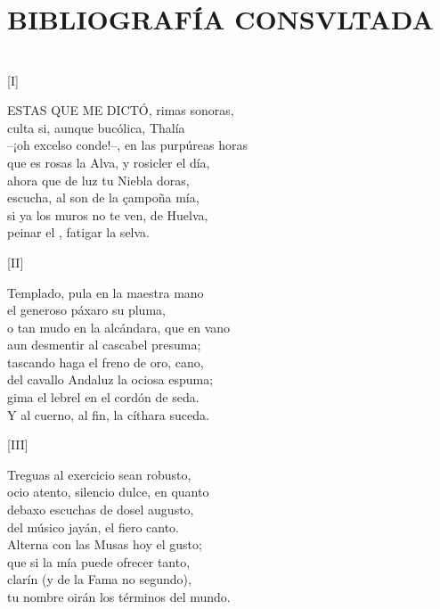 \documentclass[11pt,a4paper,twoside]{article}
\begin{document}
\section*{\fontsize{11}{14}\selectfont BIBLIOGRAFÍA CONSVLTADA}
\nocite{*}
\printbibliography[heading=none]
\newpage

\section*{\centering \fontsize{11}{14}\selectfont[DEDICATORIA]}
\vspace{-1em}
%
\begin{center}
	[I]
\end{center}
\beginnumbering
\pstart
{\fontsize{9}{11}\selectfont ESTAS QUE ME DICTÓ}, rimas sonoras,\\
culta si, aunque bucólica, Thalía\\
--¡oh excelso conde!--, en las purpúreas horas\\
que es rosas la Alva, y rosicler el día,\\
ahora que de luz tu Niebla doras,\\
escucha, al son de la çampoña mía,\\
si ya los muros no te ven, de Huelva,\\
peinar el , fatigar la selva.\par\pend
%
\begin{center}
	[II]
\end{center}
\pstart
Templado, pula en la maestra mano\\
el generoso páxaro su pluma,\\
o tan mudo en la alcándara, que en vano\\
aun desmentir al cascabel presuma;\\
tascando haga el freno de oro, cano,\\
del cavallo Andaluz la ociosa espuma;\\
gima el lebrel en el cordón de seda.\\
Y al cuerno, al fin, la cíthara suceda.\par\pend
%
\begin{center}
	[III]
\end{center}
\pstart
Treguas al exercicio sean robusto,\\
ocio atento, silencio dulce, en quanto\\
debaxo escuchas de dosel augusto,\\
del músico jayán, el fiero canto.\\
Alterna con las Musas hoy el gusto;\\
que si la mía puede ofrecer tanto,\\
clarín (y de la Fama no segundo),\\
tu nombre oirán los términos del mundo.\par\pend
%
\end{document}
